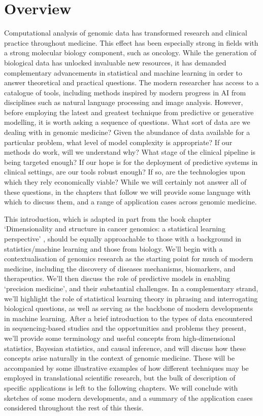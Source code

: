 \documentclass[thesis.tex]{subfiles}
\begin{document}
\section{Overview} 
Computational analysis of genomic data has transformed research and clinical practice throughout medicine. This effect has been especially strong in fields with a strong molecular biology component, such as oncology. While the generation of biological data has unlocked invaluable new resources, it has demanded complementary advancements in statistical and machine learning in order to answer theoretical and practical questions. The modern researcher has access to a catalogue of tools, including methods inspired by modern progress in AI from disciplines such as natural language processing and image analysis. However, before employing the latest and greatest technique 
from predictive or generative modelling, it is worth asking a sequence of questions. What sort of data are we dealing with in genomic medicine? Given the abundance of data available for a particular problem, what level of model complexity is appropriate? If our methods do work, will we understand why? What stage of the clinical pipeline is being targeted enough? If our hope is for the deployment of predictive systems in clinical settings, are our tools robust enough? If so, are the technologies upon which they rely economically viable? While we will certainly not answer all of these questions, in the chapters that follow we will provide some language with which to discuss them, and a range of application cases across genomic medicine. 

This introduction, which is adapted in part from the book chapter `Dimensionality and structure in cancer genomics: a statistical learning
perspective' \citep{bradley_dimensionality_2020}, should be equally approachable to those with a background in statistics/machine learning and those from biology. We'll begin with a contextualisation of genomics research as the starting point for much of modern medicine, including the discovery of diseases mechanisms, biomarkers, and therapeutics. We'll then discuss the role of predictive models in enabling `precision medicine', and their substantial challenges. In a complementary strand, we'll highlight the role of statistical learning theory in phrasing and interrogating biological questions, as well as serving as the backbone of modern developments in machine learning. After a brief introduction to the types of data encountered in sequencing-based studies and the opportunities and problems they present, we'll provide some terminology and useful concepts from high-dimensional statistics, Bayesian statistics, and causal inference, and will discuss how these concepts arise naturally in the context of genomic medicine. These will be accompanied by some illustrative examples of how different techniques may be employed in translational scientific research, but the bulk of description of specific applications is left to the following chapters. We will conclude with sketches of some modern developments, and a summary of the application cases considered throughout the rest of this thesis.
\end{document}
